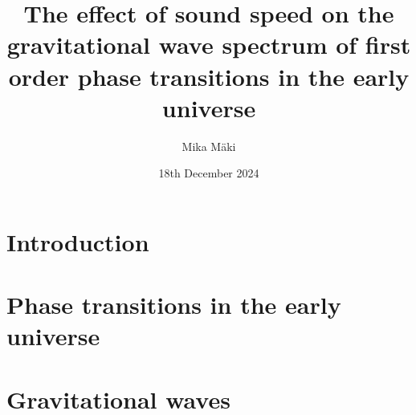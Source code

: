 \documentclass[english,twoside,openright]{UH_TCM_MSc}
\title{The effect of sound speed on the gravitational wave spectrum of first order phase transitions in the early universe}
\author{Mika Mäki}
\date{18th December 2024}
\begin{document}
\maketitle


\begin{abstract}

\end{abstract}

\mytableofcontents

\mynomenclature

\clearpage
\listoffigures
\clearpage
\listoftables
\clearpage


% 

\chapter{Introduction}
\label{ch:introduction}


\chapter{Phase transitions in the early universe}
\label{ch:pt}







% 

\clearpage


\chapter{Gravitational waves}
\label{ch:gw}

\end{document}

